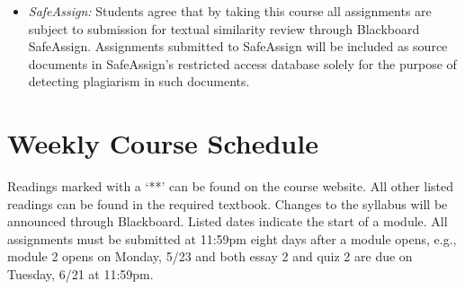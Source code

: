 \documentclass[article,oneside]{memoir}
\begin{document}
\begin{itemize}
\item \textit{SafeAssign:} Students agree that by taking this course all assignments are subject to submission for textual similarity review through Blackboard SafeAssign. Assignments submitted to SafeAssign will be included as source documents in SafeAssign's restricted access database solely for the purpose of detecting plagiarism in such documents.  


\end{itemize}



\section{Weekly Course Schedule}
Readings marked with a `**' can be found on the course website. All other listed readings can be found in the required textbook. Changes to the syllabus will be announced through Blackboard. Listed dates indicate the start of a module.  All assignments must be submitted at 11:59pm eight days after a module opens, e.g., module 2 opens on Monday, 5/23 and both essay 2 and quiz 2 are due on Tuesday, 6/21 at 11:59pm.  \newline
\end{document}
